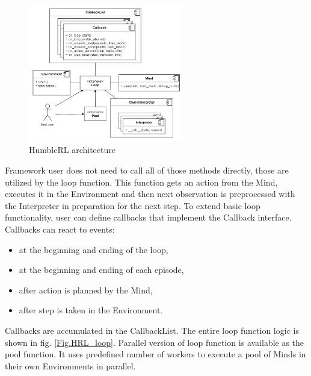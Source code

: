 \begin{figure}[H]
\includegraphics[width=0.6\textwidth,keepaspectratio]{figures/HumbleRL/architecture.png}
\caption{HumbleRL architecture}
\label{Fig.HRL_architecture}
\end{figure}

Framework user does not need to call all of those methods directly, those are utilized by the loop function. This function gets an action from the Mind, executes it in the Environment and then next observation is preprocessed with the Interpreter in preparation for the next step. To extend basic loop functionality, user can define callbacks that implement the Callback interface. Callbacks can react to events:
\begin{itemize}
\item at the beginning and ending of the loop,
\item at the beginning and ending of each episode,
\item after action is planned by the Mind,
\item after step is taken in the Environment.
\end{itemize}
Callbacks are accumulated in the CallbackList. The entire loop function logic is shown in fig. \ref{Fig.HRL_loop}.
Parallel version of loop function is available as the pool function. It uses predefined number of workers to execute a pool of Minds in their own Environments in parallel.

